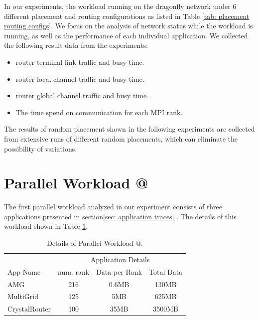 \documentclass[conference,compsoc]{IEEEtran}
\makeatletter
\newcommand{\Rmnum}[1]{\expandafter\@slowromancap\romannumeral #1@}
\makeatother
\begin{document}
In our experiments, the workload running on the dragonfly network under 6 different placement and routing configurations as listed in Table \ref{tab: placement routing configs}. We focus on the analysis of network status while the workload is running, as well as the performance of each individual application. We collected the following result data from the experiments:

\begin{itemize}
    \item router terminal link traffic and busy time.
    \item router local channel traffic and busy time.
    \item router global channel traffic and busy time.
    \item The time spend on communication for each MPI rank. 
\end{itemize}

The results of random placement shown in the following experiments are collected from extensive runs of different random placements, which can eliminate the possibility of variations.

\section{Parallel Workload \Rmnum{1 }}
\label{sec: workload 1 overview}

The first parallel workload analyzed in our experiment consists of three applications presented in section\ref{sec: application traces} . The details of this workload shown in Table \ref{tab: parallel workload-1}.

\begin{table}[ht]
\begin{center}
\caption{Details of Parallel Workload \Rmnum{1 }.} 
\label{tab: parallel workload-1}
\begin{tabular}{l c c c }
\toprule %
\toprule
&\multicolumn{3}{c}{Application Details} \\ %
\cmidrule(l){2-4}
App Name & num. rank & Data per Rank & Total Data\\ %
\midrule %
AMG  &    216 &   0.6MB   &     130MB\\ %
\midrule
MultiGrid  &    125 &   5MB   &     625MB\\ 
\midrule
CrystalRouter  &   100  &  35MB    &     3500MB\\ 

\midrule %
\bottomrule %
\end{tabular}
\end{center}
\end{table}
\end{document}
